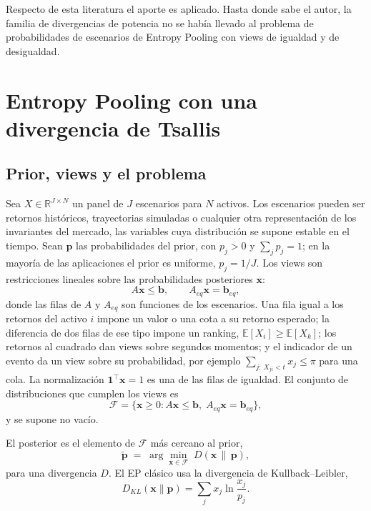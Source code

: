 \documentclass[11pt]{article}
\newcommand{\p}{\mathbf{p}}
\newcommand{\pt}{\tilde{\mathbf{p}}}
\newcommand{\x}{\mathbf{x}}
\newcommand{\R}{\mathbb{R}}
\newcommand{\E}{\mathbb{E}}
\begin{document}
Respecto de esta literatura el aporte es aplicado. Hasta donde sabe el
autor, la familia de divergencias de potencia no se hab\'ia llevado al
problema de probabilidades de escenarios de Entropy Pooling con views de
igualdad y de desigualdad.

\section{Entropy Pooling con una divergencia de Tsallis}\label{sec:framework}

\subsection{Prior, views y el problema}

Sea $X \in \R^{J \times N}$ un panel de $J$ escenarios para $N$ activos.
Los escenarios pueden ser retornos hist\'oricos, trayectorias simuladas o
cualquier otra representaci\'on de los invariantes del mercado, las
variables cuya distribuci\'on se supone estable en el tiempo. Sean $\p$ las
probabilidades del prior, con $p_j > 0$ y $\sum_j p_j = 1$; en la mayor\'ia
de las aplicaciones el prior es uniforme, $p_j = 1/J$. Los views son
restricciones lineales sobre las probabilidades posteriores $\x$:
\begin{equation}\label{eq:constraints}
A\x \le \mathbf{b}, \qquad A_{eq}\x = \mathbf{b}_{eq},
\end{equation}
donde las filas de $A$ y $A_{eq}$ son funciones de los escenarios. Una fila
igual a los retornos del activo $i$ impone un valor o una cota a su retorno
esperado; la diferencia de dos filas de ese tipo impone un ranking,
$\E[X_i] \ge \E[X_k]$; los retornos al cuadrado dan views sobre segundos
momentos; y el indicador de un evento da un view sobre su probabilidad, por
ejemplo $\sum_{j:\,X_{ji} < t} x_j \le \pi$ para una cola. La normalizaci\'on
$\mathbf{1}^\top \x = 1$ es una de las filas de igualdad. El conjunto de
distribuciones que cumplen los views es
\begin{equation}\label{eq:feasible}
\mathcal{F} = \{\x \ge 0 : A\x \le \mathbf{b},\; A_{eq}\x = \mathbf{b}_{eq}\},
\end{equation}
y se supone no vac\'io.

El posterior es el elemento de $\mathcal{F}$ m\'as cercano al prior,
\begin{equation}\label{eq:primal}
\pt \;=\; \arg\min_{\x \in \mathcal{F}} \; D(\x \,\|\, \p),
\end{equation}
para una divergencia $D$. El EP cl\'asico usa la divergencia de
Kullback--Leibler,
\[
D_{KL}(\x\|\p) = \sum_j x_j \ln \frac{x_j}{p_j}.
\]
\end{document}

